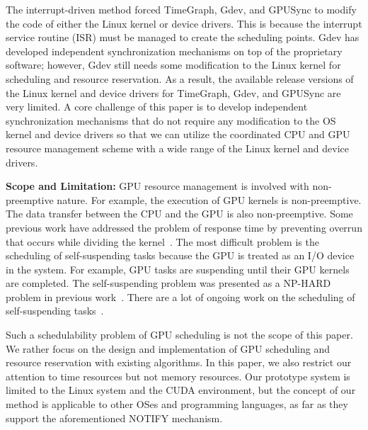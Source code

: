 The interrupt-driven method forced TimeGraph, Gdev, and GPUSync to
modify the code of either the Linux kernel or device drivers.
This is because the interrupt service routine (ISR) must be managed to
create the scheduling points.
Gdev has developed independent synchronization mechanisms on top of the
proprietary software; however, Gdev still needs some modification to the
Linux kernel for scheduling and resource reservation.
As a result, the available release versions of the Linux kernel and
device drivers for TimeGraph, Gdev, and GPUSync are very limited.
A core challenge of this paper is to develop independent synchronization
mechanisms that do not require any modification to the OS kernel and
device drivers so that we can utilize the coordinated CPU and GPU
resource management scheme with a wide range of the Linux kernel and
device drivers. 

\textbf{Scope and Limitation:}
GPU resource management is involved with non-preemptive nature.
For example, the execution of GPU kernels is non-preemptive.
The data transfer between the CPU and the GPU is also non-preemptive.
Some previous work have addressed the problem of response time by
preventing overrun that occurs while dividing the
kernel~\cite{basaran:preemptive,sparc}.
The most difficult problem is the scheduling of self-suspending tasks
because the GPU is treated as an I/O device in the system. 
For example, GPU tasks are suspending until their GPU kernels are
completed.
The self-suspending problem was presented as a NP-HARD problem in
previous work~\cite{self-sus:1,self-sus:2}.
There are a lot of ongoing work on the scheduling of self-suspending
tasks~\cite{chattopadhyay2014limited,kim2013segment}.

Such a schedulability problem of GPU scheduling is not the scope of this
paper.
We rather focus on the design and implementation of GPU scheduling and
resource reservation with existing algorithms.
In this paper, we also restrict our attention to time resources but not
memory resources.
Our prototype system is limited to the Linux system and the CUDA
environment, but the concept of our method is applicable to other OSes
and programming languages, as far as they support the aforementioned
NOTIFY mechanism.

